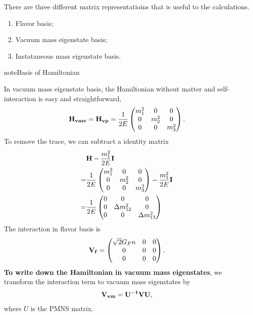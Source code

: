 \documentclass[letterpaper,12pt,english]{sphinxmanual}
\begin{document}
There are three different matrix representatioins that is useful to the calculations.
\begin{enumerate}
\item {} 
Flavor basis;

\item {} 
Vacuum mass eigenstate basis;

\item {} 
Instataneous mass eigenstate basis.

\end{enumerate}

\begin{notice}{note}{Basis of Hamiltonian}

In vacuum mass eigenstate basis, the Hamiltonian without matter and self-interaction is easy and straightforward,
\begin{gather}
\begin{split}\mathbf{H_{vmv}} = \mathbf{H_{vp}} = \frac{1}{2E}\begin{pmatrix} m_1^2 & 0 & 0 \\ 0 & m_2^2 & 0  \\ 0 & 0 & m_3^2
\end{pmatrix}.\end{split}\notag
\end{gather}
To remove the trace, we can subtract a identity matrix
\begin{gather}
\begin{split}&\mathbf{H}- \frac{m_1^2}{2E}\mathbf{I} \\
=& \frac{1}{2E}\begin{pmatrix}
m_1^2 & 0 & 0 \\
0 & m_2^2 &  0\\
0 & 0 & m_3^2
\end{pmatrix} - \frac{m_1^2}{2E} \mathbf{I} \\
=& \frac{1}{2E} \begin{pmatrix}
0 & 0 & 0 \\
0 & \Delta m_{12}^2 & 0 \\
0 & 0 & \Delta m_{13}^2
\end{pmatrix}\end{split}\notag
\end{gather}
The interaction in flavor basis is
\begin{gather}
\begin{split}\mathbf{V_f} = \begin{pmatrix} \sqrt{2}G_F n & 0 & 0 \\ 0 & 0 & 0\\ 0 & 0 & 0 \end{pmatrix}.\end{split}\notag
\end{gather}
\textbf{To write down the Hamiltonian in vacuum mass eigenstates}, we transform the interaction term to vacuum mass eigenstates by
\begin{gather}
\begin{split}\mathbf{V_{vm}} = \mathbf{U^{-1}} \mathbf{V} \mathbf{U},\end{split}\notag
\end{gather}
where \(U\) is the PMNS matrix.


\end{notice}
\end{document}
